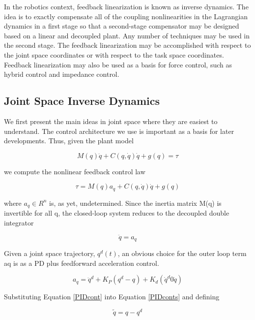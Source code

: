 \documentclass{UoNMCHA}
\numberwithin{equation}{section}
\begin{document}
	In the robotics context, feedback linearization is known as inverse dynamics. The idea is to exactly compensate all of the coupling nonlinearities in the Lagrangian dynamics in a first stage so that a second-stage compensator may be designed based on a linear and decoupled plant. Any number of techniques may be used in the second stage. The feedback linearization may be   accomplished with respect to the joint space coordinates or with respect to the task space coordinates. Feedback linearization may also be used as a basis for force control, such as hybrid control and impedance control. 
	
	\subsection{Joint Space Inverse Dynamics}
	
	
	We first present the main ideas in joint space where they are easiest to understand. The control architecture we use is important as a basis for later developments. Thus, given the plant model
	
	\begin{equation}\label{syseq}
	M(q)\ddot{q}+C(q,\dot{q})\dot{q}+g(q)=\tau
	\end{equation}
	
	we compute the nonlinear feedback control law
	
	\begin{equation}\label{feedbacklin}
	\tau = M(q)a_{q}+C(q,\dot{q})\dot{q}+g(q)
	\end{equation}
	
	where $a_q \in R^n$ is, as yet, undetermined. Since the inertia matrix M(q) is invertible for all q, the closed-loop system reduces to the decoupled double integrator  
	
	\begin{equation}\label{PIDconts}
	\ddot{q} = a_{q}
	\end{equation}
	
	Given a joint space trajectory, $q^d (t)$, an obvious choice for the outer loop term aq is as a PD plus feedforward acceleration control.  
	
	\begin{equation}\label{PIDcont}
	a_{q} = \ddot{q}^d + K_P (q^d - q) + K_d (\dot{q}^d 0 \dot{q})
	\end{equation}
	
	Substituting Equation \ref{PIDcont} into Equation \ref{PIDconts} and defining
	
	\begin{equation}\label{PIDconts}
	\tilde{q} = q - q^d
	\end{equation}
	
\end{document}
